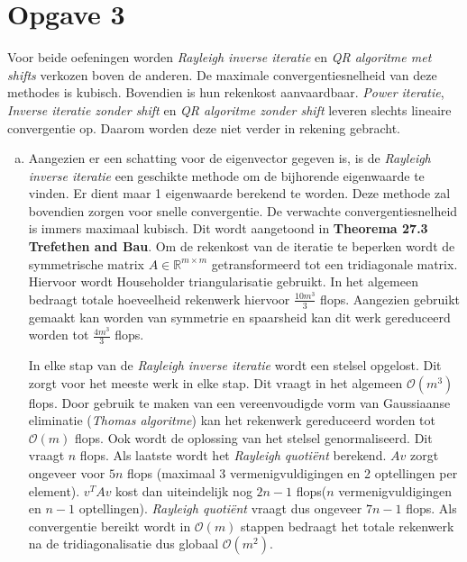 \documentclass[a4paper]{article}
\newcommand{\opgave}[1]{\section*{Opgave #1}}
\begin{document}
\opgave{3}
Voor beide oefeningen worden \textit{Rayleigh inverse iteratie} en \textit{QR algoritme met shifts} verkozen boven de anderen. De maximale convergentiesnelheid van deze methodes is kubisch. Bovendien is hun rekenkost aanvaardbaar. \textit{Power iteratie}, \textit{Inverse iteratie zonder shift} en \textit{QR algoritme zonder shift} leveren slechts lineaire convergentie op. Daarom worden deze niet verder in rekening gebracht. 
\begin{enumerate}[a)] %
\item 
Aangezien er een schatting voor de eigenvector gegeven is, is de \textit{Rayleigh inverse iteratie} een geschikte methode om de bijhorende eigenwaarde te vinden. Er dient maar 1 eigenwaarde berekend te worden. Deze methode zal bovendien zorgen voor snelle convergentie. De verwachte convergentiesnelheid is immers maximaal kubisch. Dit wordt aangetoond in \textbf{Theorema 27.3 Trefethen and Bau}. Om de rekenkost van de iteratie te beperken wordt de symmetrische matrix $A \in \mathbb{R}^{m\times m}$ getransformeerd tot een tridiagonale matrix. Hiervoor wordt Householder triangularisatie gebruikt. In het algemeen bedraagt totale hoeveelheid rekenwerk hiervoor  $\frac{10m^{3}}{3}$ flops. Aangezien gebruikt gemaakt kan worden van symmetrie en spaarsheid kan dit werk gereduceerd worden tot $\frac{4m^{3}}{3}$ flops. 

In elke stap van de \textit{Rayleigh inverse iteratie} wordt een stelsel opgelost. Dit zorgt voor het meeste werk in elke stap. Dit vraagt in het algemeen $\mathcal{O} (m^3)$ flops. Door gebruik te maken van een vereenvoudigde vorm van Gaussiaanse eliminatie (\textit{Thomas algoritme}) kan het rekenwerk gereduceerd worden tot $\mathcal{O}(m)$ flops. Ook wordt de oplossing van het stelsel genormaliseerd. Dit vraagt $n$ flops. Als laatste wordt het \textit{Rayleigh quoti\"ent} berekend. $Av$ zorgt ongeveer voor $5n$ flops (maximaal 3 vermenigvuldigingen en 2 optellingen per element). $v^{T}Av$ kost dan uiteindelijk nog $2n-1$ flops($n$ vermenigvuldigingen en $n-1$ optellingen). \textit{Rayleigh quoti\"ent} vraagt dus ongeveer $7n-1$ flops. Als convergentie bereikt wordt in $\mathcal{O}(m)$ stappen bedraagt het totale rekenwerk na de tridiagonalisatie dus globaal $\mathcal{O} (m^2)$.


\end{enumerate}
\end{document}
